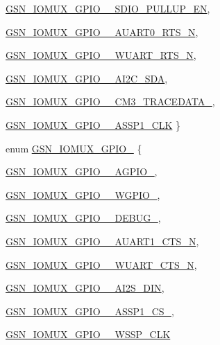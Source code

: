 \begin{DoxyCompactItemize}
\hyperlink{a00519_ad659954601e98e1c08044b2365c23e49aa34114773ee1a28296e1c0c6fadf1687}{GSN\_\-IOMUX\_\-GPIO\_\_\-SDIO\_\-PULLUP\_\-EN}, 
\par
\hyperlink{a00519_ad659954601e98e1c08044b2365c23e49a7afe39fb34ce8f0a9af5a4ecdf250308}{GSN\_\-IOMUX\_\-GPIO\_\_\-AUART0\_\-RTS\_\-N}, 
\par
\hyperlink{a00519_ad659954601e98e1c08044b2365c23e49aee989d145c7c3bfe93ecebd774211a54}{GSN\_\-IOMUX\_\-GPIO\_\_\-WUART\_\-RTS\_\-N}, 
\par
\hyperlink{a00519_ad659954601e98e1c08044b2365c23e49a717bd9515f4e82ffea029f7c320f6f8c}{GSN\_\-IOMUX\_\-GPIO\_\_\-AI2C\_\-SDA}, 
\par
\hyperlink{a00519_ad659954601e98e1c08044b2365c23e49ab52a9be53af1150dc7b1ff2cb9245a92}{GSN\_\-IOMUX\_\-GPIO\_\_\-CM3\_\-TRACEDATA\_}, 
\par
\hyperlink{a00519_ad659954601e98e1c08044b2365c23e49aa0758ab5b4654cf7b20d1c6f2f50fa28}{GSN\_\-IOMUX\_\-GPIO\_\_\-ASSP1\_\-CLK}
 \}
\item 
enum \hyperlink{a00519_a1075add52e88940a7f4adf39833f85c4}{GSN\_\-IOMUX\_\-GPIO\_} \{ \par
\hyperlink{a00519_a1075add52e88940a7f4adf39833f85c4a223c1f00e48f6adbebc0caa0abb90a36}{GSN\_\-IOMUX\_\-GPIO\_\_\-AGPIO\_}, 
\par
\hyperlink{a00519_a1075add52e88940a7f4adf39833f85c4ab89d09b0de987bbe320c61a4c81e9754}{GSN\_\-IOMUX\_\-GPIO\_\_\-WGPIO\_}, 
\par
\hyperlink{a00519_a1075add52e88940a7f4adf39833f85c4af3cfc3f494895101020f4b82d8d9877d}{GSN\_\-IOMUX\_\-GPIO\_\_\-DEBUG\_}, 
\par
\hyperlink{a00519_a1075add52e88940a7f4adf39833f85c4ac4b332e5671d77872e151567b86d5f11}{GSN\_\-IOMUX\_\-GPIO\_\_\-AUART1\_\-CTS\_\-N}, 
\par
\hyperlink{a00519_a1075add52e88940a7f4adf39833f85c4ac1c61a68766ea2976b7e725b4d7dfd22}{GSN\_\-IOMUX\_\-GPIO\_\_\-WUART\_\-CTS\_\-N}, 
\par
\hyperlink{a00519_a1075add52e88940a7f4adf39833f85c4a1cbdec744063244465d1134afc7076e9}{GSN\_\-IOMUX\_\-GPIO\_\_\-AI2S\_\-DIN}, 
\par
\hyperlink{a00519_a1075add52e88940a7f4adf39833f85c4aa45af9ec568b042db62d889bb3166009}{GSN\_\-IOMUX\_\-GPIO\_\_\-ASSP1\_\-CS\_}, 
\par
\hyperlink{a00519_a1075add52e88940a7f4adf39833f85c4a46cf293ead64b06eabad60d223bd4fac}{GSN\_\-IOMUX\_\-GPIO\_\_\-WSSP\_\-CLK}

\end{DoxyCompactItemize}
